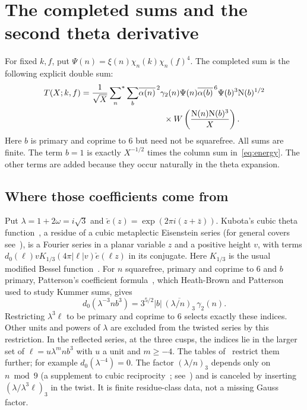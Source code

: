 \documentclass[11pt]{article}
\numberwithin{equation}{section}
\newcommand{\N}{\mathrm N}
\newcommand{\ce}{\check e}
\newcommand{\ssum}{\sideset{}{^*}\sum}
\begin{document}
\section{The completed sums and the second theta derivative}\label{sec:theta}

For fixed $k,f$, put $\Psi(n)=\xi(n)\chi_n(k)\chi_n(f)^4$.
The completed sum is the following explicit double sum:
\begin{equation}\label{eq:T}
\begin{split}
 T(X;k,f)=\frac1{\sqrt X}\ssum_n\sum_b
 &\overline{\alpha(n)}^{\,2}\gamma_2(n)\Psi(n)
 \overline{\alpha(b)}^{\,6}\Psi(b)^3\N(b)^{1/2}\\
 &\hspace{3em}\times W\left(\frac{\N(n)\N(b)^3}X\right).
\end{split}
\end{equation}
Here $b$ is primary and coprime to $6$ but need not be squarefree.
All sums are finite. The term $b=1$ is exactly $X^{-1/2}$ times the
column sum in~\eqref{eq:energy}. The other terms are added because they
occur naturally in the theta expansion.

\subsection{Where those coefficients come from}
Put $\lambda=1+2\omega=i\sqrt3$ and
$\ce(z)=\exp(2\pi i(z+\bar z))$. Kubota's cubic theta function~\cite{Kub69,Pat77}, a residue of a cubic metaplectic Eisenstein series (for general covers see~\cite{KP84}), is a
Fourier series in a planar variable $z$ and a positive height $v$,
with terms $d_0(\ell)vK_{1/3}(4\pi|\ell|v)\ce(\ell z)$ in its
conjugate. Here $K_{1/3}$ is the usual modified Bessel function~\cite[\S10.25]{DLMF}.
For $n$ squarefree, primary and coprime to $6$ and $b$ primary, Patterson's coefficient formula~\cite[Theorem~8.1]{Pat77}, which Heath-Brown and Patterson~\cite{HBP79} used to study Kummer sums, gives
\begin{equation}\label{eq:theta-coeff}
 d_0(\lambda^{-3}nb^3)
  =3^{5/2}|b|\,\overline{(\lambda/n)_3}\,\gamma_2(n).
\end{equation}
Restricting $\lambda^3\ell$ to be primary and coprime to $6$ selects
exactly these indices. Other units and powers of $\lambda$ are excluded
from the twisted series by this restriction. In the reflected series, at
the three cusps, the indices lie in the larger set of
$\ell=u\lambda^mnb^3$ with $u$ a unit and $m\ge-4$. The tables
of~\cite[Theorem~23]{QF} restrict them further; for example
$d_0(\lambda^{-4})=0$. The factor $(\lambda/n)_3$ depends only
on $n\bmod9$ (a supplement to cubic reciprocity~\cite{Eis44}; see~\cite[Chapter~7]{Lemmermeyer}) and is canceled by inserting $(\lambda/\lambda^3\ell)_3$
in the twist. It is finite residue-class data, not a missing Gauss factor.
\end{document}

